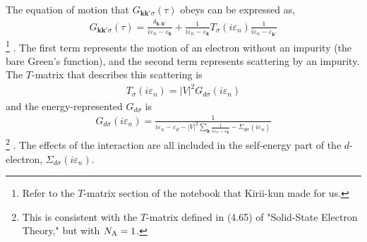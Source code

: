 \documentclass[a4j]{jarticle}
\begin{document}
The equation of motion that $G_{\bm{k}\bm{k}' \sigma}(\tau)$ obeys can be expressed as,
\begin{align}
	G_{\bm{k}\bm{k}' \sigma}(\tau)
	=
	\frac{\delta_{\bm{k},\bm{k}'}}{
		i \varepsilon_{n} - \varepsilon_{\bm{k}}
	}
	+
	\frac{1}{
		i \varepsilon_{n} - \varepsilon_{\bm{k}}
	}
	T_{\sigma}(i \varepsilon_{n})
	\frac{1}{
		i \varepsilon_{n} - \varepsilon_{\bm{k}'}
	}
\end{align}
\footnote{
	Refer to the $T$-matrix section of the notebook that Kirii-kun made for us.
}
.
The first term represents the motion of an electron without an impurity (the bare Green's function), and the second term represents scattering by an impurity.
The $T$-matrix that describes this scattering is
\begin{align}
	T_{\sigma}(i \varepsilon_{n})
	=
	|V|^{2}
	G_{d \sigma}(i \varepsilon_{n})
\end{align}
and the energy-represented $G_{d \sigma}$ is
\begin{align}
	G_{d \sigma}(i \varepsilon_{n})
	=
	\frac{1}{
		\displaystyle
		i \varepsilon_{n}
		-
		\varepsilon_{d}
		-
		|V|^{2}
		\displaystyle
		\sum_{\bm{k}}
		\frac{1}{
			i \varepsilon_{n} - \varepsilon_{\bm{k}}
		}
		-
		\Sigma_{d\sigma}(i \varepsilon_{n})
	}
\end{align}
\footnote{
	This is consistent with the $T$-matrix defined in (4.65) of "Solid-State Electron Theory," but with $N_{\rm A}=1$.
}
.
The effects of the interaction are all included in the self-energy part of the $d$-electron, $\Sigma_{d\sigma}(i \varepsilon_{n})$.
\end{document}
